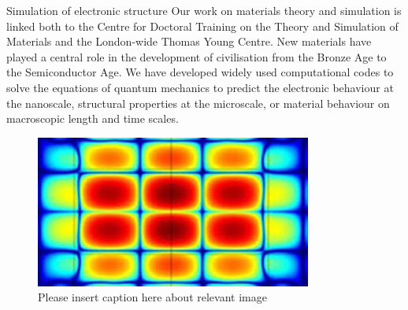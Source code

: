 \documentclass[xcolor={table}]{beamer}
\begin{document}
\begin{frame}[fragile=singleslide,t]
\begin{columns}[onlytextwidth,T]
\begin{column}{.47\textwidth}
\begin{block}{Simulation of electronic structure}
Our work on materials theory and simulation is linked both to the Centre for
Doctoral Training on the Theory and Simulation of Materials and the London-wide
Thomas Young Centre. New materials have played a central role in the development
of civilisation from the Bronze Age to the Semiconductor Age. We have developed
widely used computational codes to solve the equations of quantum mechanics to
predict the electronic behaviour at the nanoscale, structural properties at the
microscale, or material behaviour on macroscopic length and time scales.
\end{block}

\begin{figure}
    \includegraphics[width=\columnwidth, height=0.15\textheight]{simulation_materials.jpg}
    \caption{\footnotesize Please insert caption here about relevant image}
\end{figure}

\end{column}
\end{columns}

\end{frame}
\end{document}
